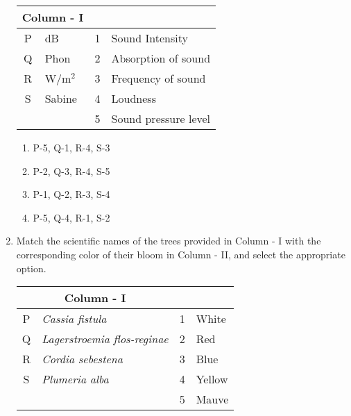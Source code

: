 \documentclass[12pt]{article}
\begin{document}
\begin{enumerate}[label=Q.\arabic*,start=26]
		\begin{center}
			\begin{tabular}{|c|>{\raggedright\arraybackslash}p{4cm}|c|>{\raggedright\arraybackslash}p{6cm}|}
				\hline
				\multicolumn{2}{|c|}{\textbf{Column - I}} & \multicolumn{2}{c|}{\textbf{Column - II}} \\
				\hline
				P & dB & 1 & Sound Intensity \\
				\hline
				Q & Phon & 2 & Absorption of sound \\
				\hline
				R & W/m$^2$ & 3 & Frequency of sound \\
				\hline
				S & Sabine & 4 & Loudness \\
				\hline
				& & 5 & Sound pressure level \\
				\hline
			\end{tabular}
		\end{center}

		\begin{multicols}{2}
			\begin{enumerate}
				\item P-5, Q-1, R-4, S-3
				\item P-2, Q-3, R-4, S-5
				\item P-1, Q-2, R-3, S-4
				\item P-5, Q-4, R-1, S-2
			\end{enumerate}
		\end{multicols}

	\item Match the scientific names of the trees provided in Column - I with the corresponding color of their bloom in Column - II, and select the appropriate option.

		\begin{center}
			\begin{tabular}{|c|>{\raggedright\arraybackslash}p{5.8cm}|c|>{\raggedright\arraybackslash}p{5.8cm}|}
				\hline
				\multicolumn{2}{|c|}{\textbf{Column - I}} & \multicolumn{2}{c|}{\textbf{Column - II}} \\
				\hline
				P & \textit{Cassia fistula} & 1 & White \\
				\hline
				Q & \textit{Lagerstroemia flos-reginae} & 2 & Red \\
				\hline
				R & \textit{Cordia sebestena} & 3 & Blue \\
				\hline
				S & \textit{Plumeria alba} & 4 & Yellow \\
				\hline
				&  & 5 & Mauve \\
				\hline
			\end{tabular}
		\end{center}


\end{enumerate}
\end{document}

